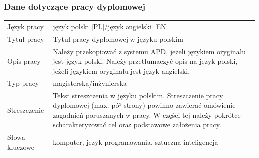 \subsubsection*{Dane dotyczące pracy dyplomowej}
\begin{tabular}{p{3cm}p{12cm}}
Język pracy & język polski [PL]/język angielski [EN] \\
Tytuł pracy  & Tytuł pracy dyplomowej w języku \mbox{polskim}\\
Opis pracy & Należy przekopiować z systemu APD, jeżeli językiem oryginału jest język polski. Należy przetłumaczyć opis na język polski, jeżeli językiem oryginału jest język angielski.\\
Typ pracy & magisterska/inżynierska\\
Streszczenie  & Tekst streszczenia w języku polskim. Streszczenie pracy dyplomowej (max. pó³ strony) powinno zawierać omówienie zagadnień poruszanych w pracy. W części tej należy pokrótce scharakteryzować cel oraz podstawowe założenia pracy.\\
Słowa kluczowe & komputer, język programowania, sztuczna inteligencja \\
\end{tabular}





